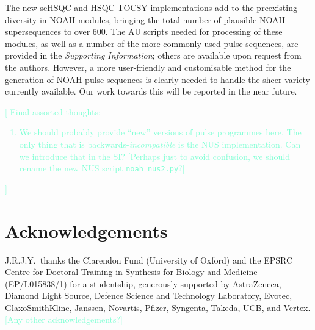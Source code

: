 \documentclass[11pt]{article}
\newcommand*{\hl}[1]{\textcolor{Aquamarine}{[#1]}}
\newcommand*{\SInf}{\textit{Supporting Information}}
\begin{document}
The new seHSQC and HSQC-TOCSY implementations add to the preexisting diversity in NOAH modules, bringing the total number of plausible NOAH supersequences to over 600.
The AU scripts needed for processing of these modules, as well as a number of the more commonly used pulse sequences, are provided in the \SInf{}; others are available upon request from the authors.
However, a more user-friendly and customisable method for the generation of NOAH pulse sequences is clearly needed to handle the sheer variety currently available.
Our work towards this will be reported in the near future.

\hl{
    Final assorted thoughts:
    \begin{enumerate}
        \item We should probably provide ``new'' versions of pulse programmes here. The only thing that is backwards-\textit{incompatible} is the NUS implementation. Can we introduce that in the SI? [Perhaps just to avoid confusion, we should rename the new NUS script \texttt{noah\_nus2.py}?]
    \end{enumerate}
}


\section*{Acknowledgements}

J.R.J.Y.\ thanks the Clarendon Fund (University of Oxford) and the EPSRC Centre for Doctoral Training in Synthesis for Biology and Medicine (EP/L015838/1) for a studentship, generously supported by AstraZeneca, Diamond Light Source, Defence Science and Technology Laboratory, Evotec, GlaxoSmithKline, Janssen, Novartis, Pfizer, Syngenta, Takeda, UCB, and Vertex.
\hl{Any other acknowledgements?}

\printbibliography


\end{document}
